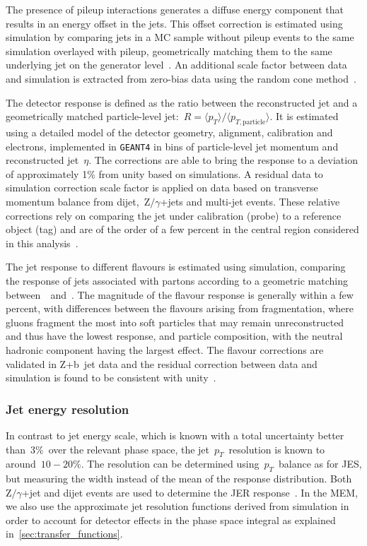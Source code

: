 The presence of pileup interactions generates a diffuse energy component that results in an energy offset in the jets. This offset correction is estimated using simulation by comparing jets in a MC sample without pileup events to the same simulation overlayed with pileup, geometrically matching them to the same underlying jet on the generator level~\cite{cms_jec_2017}. An additional scale factor between data and simulation is extracted from zero-bias data using the random cone method~\cite{Chatrchyan:2011ds}.  

The detector response is defined as the ratio between the reconstructed jet and a geometrically matched particle-level jet:~$R = \langle p_T \rangle / \langle p_{T,\mathrm{particle}} \rangle$. It is estimated using a detailed model of the detector geometry, alignment, calibration and electrons, implemented in \texttt{GEANT4} in bins of particle-level jet momentum and reconstructed jet~$\eta$. The corrections are able to bring the response to a deviation of approximately 1\% from unity based on simulations. A residual data to simulation correction scale factor is applied on data based on transverse momentum balance from dijet,~$\mathrm{Z}/\gamma$+jets and multi-jet events. These relative corrections rely on comparing the jet under calibration (probe) to a reference object (tag) and are of the order of a few percent in the central region considered in this analysis~\cite{Chatrchyan:2011ds,cms_jec_2017}.

The jet response to different flavours is estimated using simulation, comparing the response of jets associated with partons according to a geometric matching between~\pythia~and~\herwig. The magnitude of the flavour response is generally within a few percent, with differences between the flavours arising from fragmentation, where gluons fragment the most into soft particles that may remain unreconstructed and thus have the lowest response, and particle composition, with the neutral hadronic component having the largest effect. The flavour corrections are validated in Z+b~jet data and the residual correction between data and simulation is found to be consistent with unity~\cite{Chatrchyan:2011ds}.

\subsubsection{Jet energy resolution}
In contrast to jet energy scale, which is known with a total uncertainty better than~$3\%$~over the relevant phase space, the jet~$p_T$~resolution is known to around~$10-20\%$. The resolution can be determined using~$p_T$~balance as for JES, but measuring the width instead of the mean of the response distribution. Both~$\mathrm{Z}/\gamma$+jet and dijet events are used to determine the JER response~\cite{Chatrchyan:2011ds}. In the MEM, we also use the approximate jet resolution functions derived from simulation in order to account for detector effects in the phase space integral as explained in~\cref{sec:transfer_functions}.

